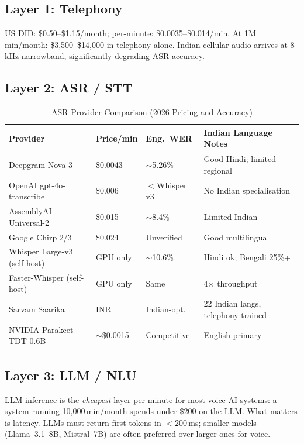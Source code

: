 \documentclass[12pt,a4paper]{article}
\begin{document}
\subsection{Layer 1: Telephony}

US DID: \$0.50--\$1.15/month; per-minute: \$0.0035--\$0.014/min.  At
1M\,min/month: \$3{,}500--\$14{,}000 in telephony alone.  Indian cellular
audio arrives at 8\,kHz narrowband, significantly degrading ASR accuracy.

\subsection{Layer 2: ASR / STT}

\begin{table}[H]\centering
\caption{ASR Provider Comparison (2026 Pricing and Accuracy)}
\label{tab:asr}
\small
\begin{tabularx}{\textwidth}{L{3.4cm}L{1.8cm}L{2.0cm}X}
\toprule
\textbf{Provider} & \textbf{Price/min} & \textbf{Eng.\ WER} & \textbf{Indian Language Notes} \\
\midrule
Deepgram Nova-3              & \$0.0043  & $\sim$5.26\%  & Good Hindi; limited regional \\
OpenAI gpt-4o-transcribe     & \$0.006   & $<$Whisper v3 & No Indian specialisation \\
AssemblyAI Universal-2       & \$0.015   & $\sim$8.4\%   & Limited Indian \\
Google Chirp 2/3             & \$0.024   & Unverified    & Good multilingual \\
Whisper Large-v3 (self-host) & GPU only  & $\sim$10.6\%  & Hindi ok; Bengali 25\%+ \\
Faster-Whisper (self-host)   & GPU only  & Same          & 4$\times$ throughput \\
Sarvam Saarika               & INR       & Indian-opt.   & 22 Indian langs, telephony-trained \\
NVIDIA Parakeet TDT 0.6B     & $\sim$\$0.0015 & Competitive & English-primary \\
\bottomrule
\end{tabularx}
\end{table}

\subsection{Layer 3: LLM / NLU}

LLM inference is the \emph{cheapest} layer per minute for most voice AI
systems: a system running 10{,}000\,min/month spends under \$200 on the LLM.
What matters is latency.  LLMs must return first tokens in $<$200\,ms;
smaller models (Llama~3.1~8B, Mistral~7B) are often preferred over larger
ones for voice.
\end{document}
